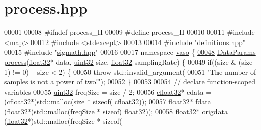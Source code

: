 \hypertarget{process_8hpp_source}{\section{process.\+hpp}
\label{process_8hpp_source}
}

\begin{DoxyCode}
00001 
00008 \textcolor{preprocessor}{#ifndef process\_H}
00009 \textcolor{preprocessor}{#define process\_H}
00010 
00011 \textcolor{preprocessor}{#include <map>}
00012 \textcolor{preprocessor}{#include <stdexcept>}
00013 
00014 \textcolor{preprocessor}{#include "\hyperlink{definitions_8hpp}{definitions.hpp}"}
00015 \textcolor{preprocessor}{#include "\hyperlink{sigmath_8hpp}{sigmath.hpp}"}
00016 
00017 \textcolor{keyword}{namespace }\hyperlink{namespacevaso}{vaso} \{    
\hypertarget{process_8hpp_source_l00048}{}\hyperlink{namespacevaso_a8136a2891983f7a41768330e018e3232}{00048}     \hyperlink{structDataParams}{DataParams} \hyperlink{namespacevaso_a8136a2891983f7a41768330e018e3232}{process}(\hyperlink{definitions_8hpp_aacdc525d6f7bddb3ae95d5c311bd06a1}{float32}* data, \hyperlink{definitions_8hpp_a1134b580f8da4de94ca6b1de4d37975e}{uint32} size, 
      \hyperlink{definitions_8hpp_aacdc525d6f7bddb3ae95d5c311bd06a1}{float32} samplingRate) \{
00049         \textcolor{keywordflow}{if}((size & (size - 1) != 0) || size < 2) \{
00050             \textcolor{keywordflow}{throw} std::invalid\_argument(
00051                     \textcolor{stringliteral}{"The number of samples is not a power of two!"});
00052         \}
00053 
00054         \textcolor{comment}{// declare function-scoped variables}
00055         \hyperlink{definitions_8hpp_a1134b580f8da4de94ca6b1de4d37975e}{uint32} freqSize = size / 2;
00056         \hyperlink{definitions_8hpp_a960be6b6614c08090c16574dba10a421}{cfloat32}* cdata = (\hyperlink{definitions_8hpp_a960be6b6614c08090c16574dba10a421}{cfloat32}*)std::malloc(size * \textcolor{keyword}{sizeof}(
      \hyperlink{definitions_8hpp_a960be6b6614c08090c16574dba10a421}{cfloat32}));
00057         \hyperlink{definitions_8hpp_aacdc525d6f7bddb3ae95d5c311bd06a1}{float32}* fdata = (\hyperlink{definitions_8hpp_aacdc525d6f7bddb3ae95d5c311bd06a1}{float32}*)std::malloc(freqSize * \textcolor{keyword}{sizeof}(
      \hyperlink{definitions_8hpp_aacdc525d6f7bddb3ae95d5c311bd06a1}{float32}));
00058         \hyperlink{definitions_8hpp_aacdc525d6f7bddb3ae95d5c311bd06a1}{float32}* origdata = (\hyperlink{definitions_8hpp_aacdc525d6f7bddb3ae95d5c311bd06a1}{float32}*)std::malloc(freqSize * \textcolor{keyword}{sizeof}(

\end{DoxyCode}
